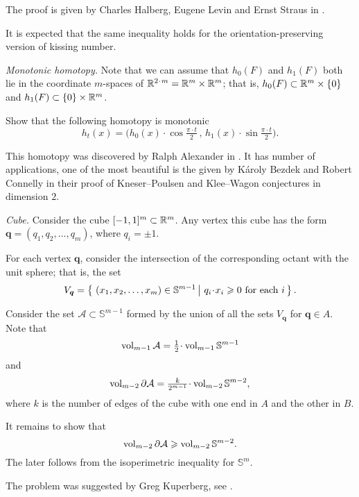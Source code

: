 The proof is given by 
Charles Halberg, 
Eugene Levin 
and Ernst Straus 
in \cite{halberg-levin-straus}.

It is expected that the same inequality holds for the orientation-preserving version of kissing number.



\textit{Monotonic homotopy.}
Note that we can assume
that $h_0(F)$ and $h_1(F)$ both lie in the coordinate $m$-spaces of $\RR^{2\cdot m}=\RR^m\times \RR^m$;
that is,
$h_0(F)\z\subset\RR^m\times\{0\}$
and $h_1(F)\subset  \{0\}\times\mathbb{R}^m$.

Show that the following homotopy is monotonic
\[h_t(x)=\bigl(h_0(x)\cdot \cos\tfrac{\pi\cdot t}2
\,,\,
 h_1(x)\cdot\sin\tfrac{\pi\cdot t}{2}\bigr).\] 


This homotopy was discovered by Ralph Alexander in \cite{ralexander}.
It has number of applications, 
one of the most beautiful is the given 
by K{\'a}roly Bezdek 
and Robert Connelly \cite{bezdek-connelly} 
in their proof of 
Kneser--Poulsen  
and Klee--Wagon conjectures in dimension $2$.



\textit{Cube.}
Consider the cube $[-1,1]^m\subset \mathbb{R}^m$.
Any vertex this cube has the form $\bm{q}=(q_1,q_2,\dots,q_m)$,
where  $q_i=\pm1$.

For each vertex $\bm{q}$,
consider the intersection of the corresponding octant with the unit sphere;
that is, the set
\[V_{\bm{q}}=\set{(x_1,x_2,\dots,x_m)\in\mathbb{S}^{m-1}}{q_i\cdot x_i\ge 0\ \text{for each}\ i}.\]

Consider the set $\mathcal{A}\subset\mathbb{S}^{m-1}$
formed by the union of all the sets $V_{\bm{q}}$ for $\bm{q}\in A$.
Note that 
\[\vol_{m-1}\mathcal{A}=\tfrac12\cdot\vol_{m-1}\mathbb{S}^{m-1}\]
and 
\[\vol_{m-2}\partial\mathcal{A}
=
\tfrac k{2^{m-1}}\cdot\vol_{m-2}\mathbb{S}^{m-2},\]
where $k$ is the number of edges of the cube with one end in $A$ and the other in $B$.

It remains to  show that 
\[\operatorname{\rm vol}_{m-2}\partial\mathcal{A}
\geqslant \operatorname{\rm vol}_{m-2}\mathbb{S}^{m-2}.\]
The later follows from the isoperimetric inequality for $\mathbb{S}^m$. 

The problem was suggested by Greg Kuperberg, 
see \cite{One-step problems in geometry}.



